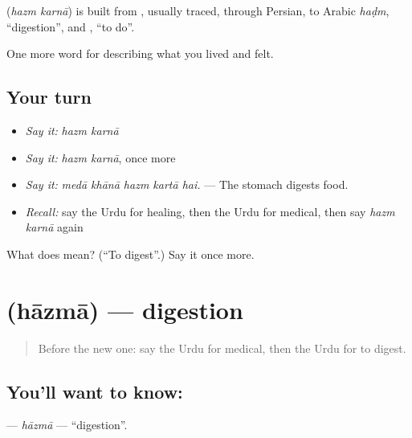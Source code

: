 \begin{cousinweb}
\textbf{ } (\emph{hazm karnā}) is built from \textbf{}, usually traced, through Persian, to Arabic \emph{haḍm}, \textquotedblleft{}digestion\textquotedblright{}, and \textbf{}, \textquotedblleft{}to do\textquotedblright{}.
\end{cousinweb}

\begin{grammarlens}[title={What you've built}]
One more word for describing what you lived and felt.
\end{grammarlens}

\subsection*{Your turn}
\begin{itemize}
\raggedright
  \item \emph{Say it:} \emph{hazm karnā}
  \item \emph{Say it:} \emph{hazm karnā}, once more
  \item \emph{Say it:} \emph{medā khānā hazm kartā hai.} — The stomach digests food.
  \item \emph{Recall:} say the Urdu for healing, then the Urdu for medical, then say \emph{hazm karnā} again
\end{itemize}

\begin{tcolorbox}[breakable,colback=teal!4,colframe=teal!35!black,title={Before you move on}]
What does   mean? (\textquotedblleft{}To digest\textquotedblright{}.) Say it once more.
\end{tcolorbox}
\section[\texorpdfstring{\ur{ہاضمہ} (hāzmā)}{ہاضمہ (hāzmā)}]{ (hāzmā) — digestion}

\label{lesson:UR-C472-hazma}



\begin{quote}
Before the new one: say the Urdu for medical, then the Urdu for to digest.
\end{quote}

\subsection*{You'll want to know: }
\textbf{} — \emph{hāzmā} — \textquotedblleft{}digestion\textquotedblright{}.

